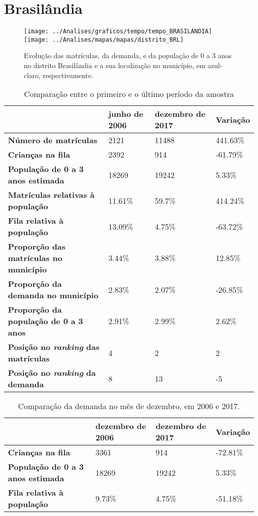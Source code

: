 \section{Brasilândia}
\begin{figure}[H]
\centering
\texttt{[image: ../Analises/graficos/tempo/tempo\_BRASILANDIA]}
\texttt{[image: ../Analises/mapas/mapas/distrito\_BRL]}
\caption{Evolução das matrículas, da demanda, e da população de 0 a 3 anos no distrito Brasilândia e a sua localização no município, em azul-claro, respectivamente.}
\end{figure}
\begin{table}[H]
\begin{tabular}{l|l|l|l}
\textbf{}                                      & \textbf{junho de 2006}       & \textbf{dezembro de 2017}    & \textbf{Variação} \\ \hline
\textbf{Número de matrículas}                  & 2121 & 11488 & 441.63\% \\ \hline
\textbf{Crianças na fila}                      & 2392 & 914 & -61.79\% \\ \hline
\textbf{População de 0 a 3 anos estimada}      & 18269 & 19242 & 5.33\% \\ \hline
\textbf{Matrículas relativas à população}      & 11.61\% & 59.7\% & 414.24\% \\ \hline
\textbf{Fila relativa à população}             & 13.09\% & 4.75\% & -63.72\% \\ \hline
\textbf{Proporção das matrículas no município} & 3.44\% & 3.88\% & 12.85\% \\ \hline
\textbf{Proporção da demanda no município}     & 2.83\% & 2.07\% & -26.85\% \\ \hline
\textbf{Proporção da população de 0 a 3 anos}  & 2.91\% & 2.99\% & 2.62\% \\ \hline
\textbf{Posição no \textit{ranking} das matrículas}     & 4 & 2 & 2 \\ \hline
\textbf{Posição no \textit{ranking} da demanda}         & 8 & 13 & -5 \\ 
\end{tabular}
\caption{Comparação entre o primeiro e o último período da amostra}
\end{table}
\begin{table}[H]
\begin{tabular}{l|l|l|l}
\textbf{}                                 & \textbf{dezembro de 2006} & \textbf{dezembro de 2017} & \textbf{Variação} \\ \hline
\textbf{Crianças na fila}                      & 3361 & 914 & -72.81\% \\ \hline
\textbf{População de 0 a 3 anos estimada}      & 18269 & 19242 & 5.33\% \\ \hline
\textbf{Fila relativa à população}             & 9.73\% & 4.75\% & -51.18\% \\
\end{tabular}
\caption{Comparação da demanda no mês de dezembro, em 2006 e 2017.}
\end{table}
